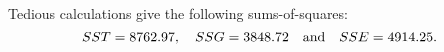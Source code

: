 \begin{solution}
Tedious calculations give the following sums-of-squares:
\[
SST = 8762.97,\quad SSG = 3848.72 \text{\quad and\quad} SSE = 4914.25.
\]

%


\end{solution}

